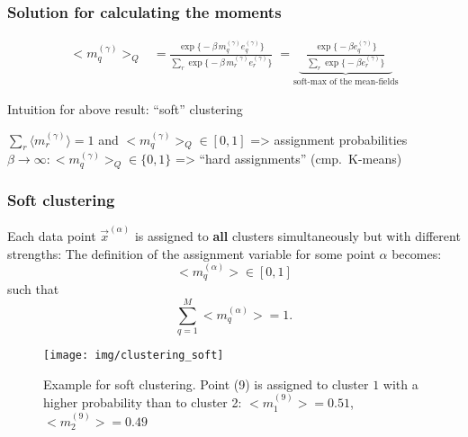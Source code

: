\begin{frame}
\frametitle{Solution for calculating the moments}
$$
		\begin{array}{lll}
	\big< m_q^{(\gamma)} \big>_Q
	& = \frac{ \exp \big\{ -\beta\, m_q^{(\gamma)} e_q^{(\gamma)} \big\} }{
	 	\sum\limits_{r} \exp \big\{ -\beta \,
	 	m_{r}^{(\gamma)} e_{r}^{(\gamma)} \big\} }
	\; = \underbrace{\;\; \frac{ \exp \big\{ -\beta e_q^{(\gamma)} \big\} }{
		\sum\limits_{r} \exp \big\{ -\beta 
		e_{r}^{(\gamma)} \big\} }\;\;}_{\text{soft-max of the mean-fields}}
	\end{array}
$$
\begin{block}{Intuition for above result: ``soft'' clustering}
\begin{itemize}
\itr $\sum_r \langle m_r^{(\gamma)} \rangle = 1$  and $\big< m_q^{(\gamma)} \big>_Q \in [0, 1]$ => assignment probabilities
\itr $\beta \rightarrow \infty: \big< m_q^{(\gamma)} \big>_Q \in \{0, 1\} $ => ``hard assignments'' (cmp.\ K-means)
\end{itemize} 
\end{block}
\end{frame}

\subsubsection{Soft clustering}

\begin{frame}{\subsecname}

Each data point $\vec x^{(\alpha)}$ is assigned to \textbf{all} clusters simultaneously but with different strengths:
The definition of the assignment variable for some point $\alpha$ becomes:
\begin{equation}
\label{eq:assignvarsoft}
\big< m_q^{(\alpha)} \big> \in [0, 1]
\end{equation}
such that
\begin{equation}
\label{eq:assignvarsoftnormalize}
\sum_{q=1}^{M}\big< m_q^{(\alpha)} \big> = 1.
\end{equation}

\begin{figure}[h!]
  \centering
\texttt{[image: img/clustering\_soft]} 
  \caption{Example for soft clustering. Point (9) is assigned to cluster $1$ with a higher probability than to cluster 2: $\big< m_1^{(9)} \big> = 0.51$, $\big< m_2^{(9)} \big> = 0.49$}
  \label{fig:clusteringsoft}
\end{figure}
\end{frame}

